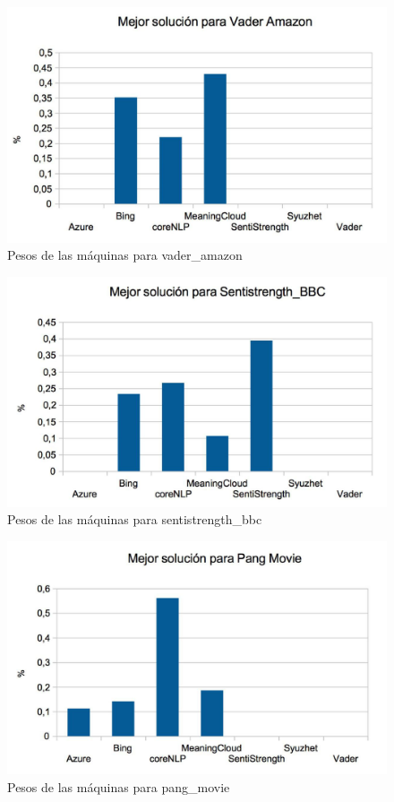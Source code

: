 \documentclass{article}
\begin{document}
\begin{figure} [H]
	\centering
	\includegraphics[width=0.7\linewidth]{amazon}
	\caption{Pesos de las máquinas para vader\_amazon}
	\label{fig:amazon}
\end{figure}

\begin{figure} [H]
	\centering
	\includegraphics[width=0.7\linewidth]{bbc}
	\caption{Pesos de las máquinas para sentistrength\_bbc}
	\label{fig:bbc}
\end{figure}

\begin{figure} [H]
	\centering
	\includegraphics[width=0.7\linewidth]{pang_movie}
	\caption{Pesos de las máquinas para pang\_movie}
	\label{fig:pangmovie}
\end{figure}
\end{document}

